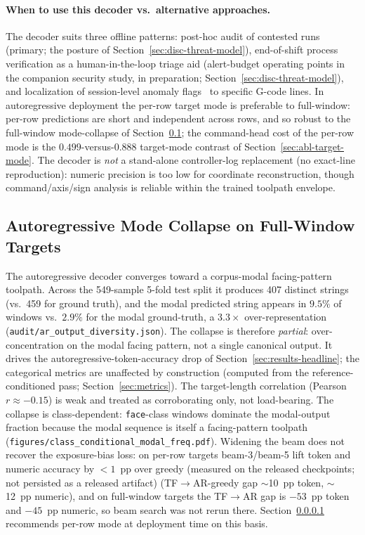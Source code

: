 \documentclass[sensors,article,submit,moreauthors,pdftex]{Definitions/mdpi}
\begin{document}
\paragraph{When to use this decoder vs.\ alternative approaches.}\label{sec:disc-when-to-use} The decoder suits three offline patterns: post-hoc audit of contested runs (primary; the posture of Section~\ref{sec:disc-threat-model}), end-of-shift process verification as a human-in-the-loop triage aid (alert-budget operating points in the companion security study, in preparation; Section~\ref{sec:disc-threat-model}), and localization of session-level anomaly flags~\cite{coelho2024anomaly,kimmell2025cnc} to specific G-code lines. In autoregressive deployment the per-row target mode is preferable to full-window: per-row predictions are short and independent across rows, and so robust to the full-window mode-collapse of Section~\ref{sec:disc-mode-collapse}; the command-head cost of the per-row mode is the $0.499$-versus-$0.888$ target-mode contrast of Section~\ref{sec:abl-target-mode}. The decoder is \emph{not} a stand-alone controller-log replacement (no exact-line reproduction): numeric precision is too low for coordinate reconstruction, though command/axis/sign analysis is reliable within the trained toolpath envelope.

\subsection{Autoregressive Mode Collapse on Full-Window Targets}
\label{sec:disc-mode-collapse}

The autoregressive decoder converges toward a corpus-modal facing-pattern toolpath. Across the 549-sample 5-fold test split it produces 407 distinct strings (vs.\ 459 for ground truth), and the modal predicted string appears in $9.5\%$ of windows vs.\ $2.9\%$ for the modal ground-truth, a $3.3\times$ over-representation (\texttt{audit/ar\_output\_diversity.json}). The collapse is therefore \emph{partial}: over-concentration on the modal facing pattern, not a single canonical output. It drives the autoregressive-token-accuracy drop of Section~\ref{sec:results-headline}; the categorical metrics are unaffected by construction (computed from the reference-conditioned pass; Section~\ref{sec:metrics}). The target-length correlation (Pearson $r \approx -0.15$) is weak and treated as corroborating only, not load-bearing. The collapse is class-dependent: \texttt{face}-class windows dominate the modal-output fraction because the modal sequence is itself a facing-pattern toolpath (\texttt{figures/class\_conditional\_modal\_freq.pdf}). Widening the beam does not recover the exposure-bias loss: on per-row targets beam-3/beam-5 lift token and numeric accuracy by $<\!1$~pp over greedy (measured on the released checkpoints; not persisted as a released artifact) (TF$\to$AR-greedy gap $\sim$10~pp token, $\sim$12~pp numeric), and on full-window targets the TF$\to$AR gap is $-53$~pp token and $-45$~pp numeric, so beam search was not rerun there. Section~\ref{sec:disc-when-to-use} recommends per-row mode at deployment time on this basis.
\end{document}
